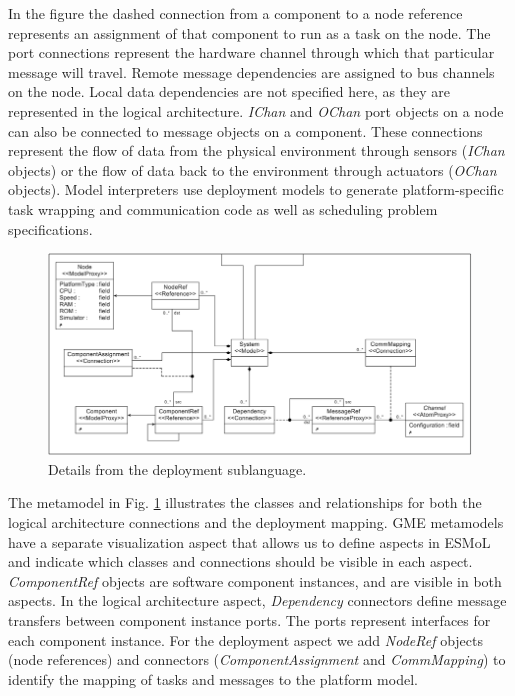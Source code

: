 \begin{itemize}
In the figure the dashed connection from 
a component to a node reference represents an assignment of 
that component to run as a task on the node.  The port 
connections represent the hardware channel through which 
that particular message will travel.  Remote message dependencies 
are assigned to bus channels on the node.  Local data 
dependencies are not specified here, as they are represented 
in the logical architecture.  \emph{IChan} and \emph{OChan} port 
objects on a node can also be connected to message objects on a component.  
These connections represent the flow of data from the physical 
environment through sensors (\emph{IChan} objects) or the flow of 
data back to the environment through actuators
(\emph{OChan} objects).  Model interpreters use deployment models to 
generate platform-specific task wrapping and communication 
code as well as scheduling problem specifications.

\begin{figure}
	\centering
	\includegraphics[width=0.85\columnwidth]{figures/depnew.png}
	\caption{Details from the deployment sublanguage.}
	\label{fig:depnew}
\end{figure}

The metamodel in Fig. \ref{fig:depnew} illustrates the 
classes and relationships for both the logical
architecture connections and the deployment mapping.  
GME metamodels have a separate visualization 
aspect that allows us to define aspects in ESMoL and 
indicate which classes and connections should be
visible in each aspect.  \emph{ComponentRef} objects are 
software component instances, and are visible in both aspects.
In the logical architecture aspect, \emph{Dependency} connectors 
define message transfers between component instance ports.  
The ports represent interfaces for each component instance.  
For the deployment aspect we add \emph{NodeRef} objects (node references) 
and connectors (\emph{ComponentAssignment} and \emph{CommMapping}) to identify
the mapping of tasks and messages to the platform model.


\end{itemize}
